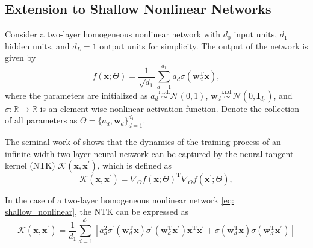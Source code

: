 \documentclass{article}
\newcommand{\T}{\mathrm{T}}
\newcommand{\R}{\mathbb{R}}
\theoremstyle{plain}
\theoremstyle{definition}
\theoremstyle{remark}
\theoremstyle{remark}
\begin{document}
\subsection{Extension to Shallow Nonlinear Networks}
\label{app: shallow_nonlinear}
Consider a two-layer homogeneous nonlinear network with $d_0$ input units, $d_1$ hidden units, and $d_L = 1$ output units for simplicity.
The output of the network is given by
\begin{equation} \label{eq: shallow_nonlinear}
  f(\mathbf{x}; \Theta) = \frac{1}{\sqrt{d_1}} \sum_{d=1}^{d_1} a_d \sigma\left(\mathbf{w}_d^{\T} \mathbf{x}\right),
\end{equation}
where the parameters are initialized as
$a_d \overset{\mathrm{i.i.d.}}{\sim} \mathcal{N}(0, 1)$, $\mathbf{w}_d \overset{\mathrm{i.i.d.}}{\sim} \mathcal{N}(0, \mathbf{I}_{d_0})$, and $\sigma: \R \to \R$ is an element-wise nonlinear activation function. 
Denote the collection of all parameters as $\Theta = \{a_d, \mathbf{w}_d\}_{d=1}^{d_1}$.

The seminal work of \citet{jacot_2018_ntk} shows that the dynamics of the training process of an infinite-width two-layer neural network can be captured by the neural tangent kernel (NTK) $\mathcal{K}(\mathbf{x}, \mathbf{x}^\prime)$, which is defined as
\begin{equation} \label{eq: ntk}
  \mathcal{K}(\mathbf{x}, \mathbf{x}^\prime) = {\nabla_{\Theta} f(\mathbf{x}; \Theta)}^{\T} \nabla_{\Theta} f(\mathbf{x}^\prime; \Theta),
\end{equation}

In the case of a two-layer homogeneous nonlinear network \cref{eq: shallow_nonlinear}, the NTK can be expressed as
\begin{equation} \label{eq: ntk_shallow}
  \mathcal{K}(\mathbf{x}, \mathbf{x}^\prime) = \frac{1}{d_1} \sum_{d=1}^{d_1} \left[a_d^2 \sigma^\prime\left(\mathbf{w}_d^{\T} \mathbf{x}\right) \sigma^\prime\left(\mathbf{w}_d^{\T} \mathbf{x}^\prime\right) \mathbf{x}^{\T} \mathbf{x}^{\prime} + \sigma(\mathbf{w}_d^{\T} \mathbf{x}) \sigma\left(\mathbf{w}_d^{\T} \mathbf{x}^\prime\right)\right]
\end{equation}
\end{document}

